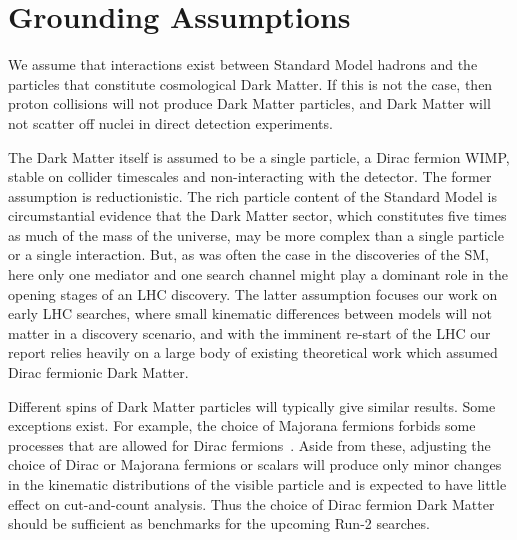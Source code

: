\section{Grounding Assumptions}

We assume that interactions exist between Standard Model hadrons
and the particles that constitute cosmological Dark Matter. If this
is not the case, then proton collisions will not produce Dark Matter
particles, and Dark Matter will not scatter off nuclei in direct
detection experiments.

The Dark Matter itself is assumed to be a single particle, a Dirac
fermion WIMP, stable on collider timescales and non-interacting with
the detector.  
The former assumption is reductionistic.
The rich particle content of the Standard Model is circumstantial evidence that
the Dark Matter sector, which constitutes five times as much of the
mass of the universe, may be more complex than a single particle or a
single interaction. But, as was often the case in the discoveries of
the SM, here only one mediator and one search channel might play a
dominant role in the opening stages of an LHC discovery. The latter
assumption focuses our work on early LHC searches, where small
kinematic differences between models will not matter in a discovery
scenario, and with the imminent re-start of the LHC our report relies
heavily on a large body of existing theoretical work which assumed Dirac fermionic Dark Matter. 

Different spins of Dark Matter particles will typically
give similar results. Some exceptions exist. For example, the choice of Majorana fermions forbids some
processes that are allowed for Dirac fermions~\cite{Goodman:2010yf}.
Aside from these, adjusting the choice of Dirac or Majorana fermions or scalars will produce only minor changes
in the kinematic distributions of the visible particle and is expected to have little effect
on cut-and-count analysis. Thus the choice of Dirac
fermion Dark Matter should be sufficient as benchmarks for the upcoming Run-2 searches. 


